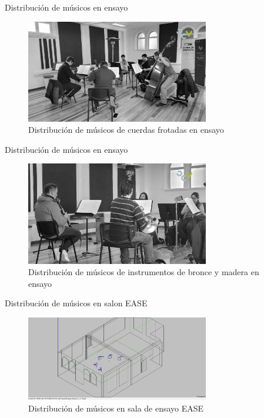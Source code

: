 \documentclass{sintefbeamer}
\begin{document}
\begin{frame}{Distribución de músicos en ensayo}
    \begin{figure}
        \centering
        \includegraphics[width=8cm]{images/OCV/OCV cuerdas.jpg}
        \caption{Distribución de músicos de cuerdas frotadas en ensayo}
    \end{figure}
\end{frame}
\begin{frame}{Distribución de músicos en ensayo}
    \begin{figure}
        \centering
        \includegraphics[width=8cm]{images/OCV/OCV vientos.jpg}
        \caption{Distribución de músicos de instrumentos de bronce y madera en ensayo}
    \end{figure}
\end{frame}
\begin{frame}{Distribución de músicos en salon EASE}
    \begin{figure}
        \centering
        \includegraphics[width=8cm]{images/Sketchup/Instrumentos_ease.png}
        \caption{Distribución de músicos en sala de ensayo EASE}
    \end{figure}
\end{frame}
\end{document}

